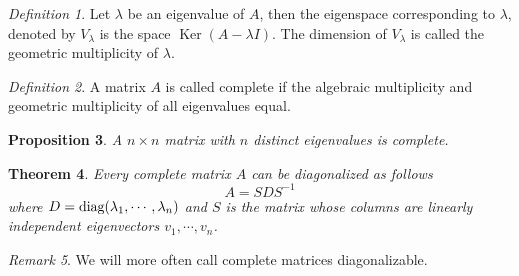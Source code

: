 \documentclass[12pt]{amsart}
\renewcommand{\ker}{\Ker}
\DeclareMathOperator{\Ker}{Ker}
\newtheorem{theorem}{Theorem}[section]
\newtheorem{proposition}[theorem]{Proposition}
\theoremstyle{remark}
\newtheorem{remark}[theorem]{Remark}
\newtheorem{definition}[theorem]{Definition}
\numberwithin{equation}{section}
\begin{document}
	\begin{definition}
		Let $\lambda$ be an eigenvalue of $A$, then the eigenspace corresponding to $\lambda$, denoted by $V_\lambda$ is the space $\ker(A-\lambda I)$. The dimension of $V_\lambda$ is called the geometric multiplicity of $\lambda$.
	\end{definition}
	
	\begin{definition}
		A matrix $A$ is called complete if the algebraic multiplicity and geometric multiplicity of all eigenvalues equal.
	\end{definition}
	\begin{proposition}
		A $n\times n$ matrix with $n$ distinct eigenvalues is complete.
	\end{proposition}
	\begin{theorem}
		Every complete matrix $A$ can be diagonalized as follows
		\[A=S D S^{-1}\]
		where $D=\textup{diag}{(\lambda_1,\cdots,\lambda_n)}$ and $S$ is the matrix whose columns are linearly independent eigenvectors $v_1,\cdots,v_n$.
	\end{theorem}
	\begin{remark}
		We will more often call complete matrices diagonalizable.
	\end{remark}

	
\end{document}
